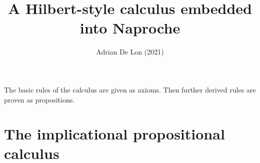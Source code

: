 \documentclass{article}
\title{A Hilbert-style calculus embedded into Naproche}
\author{Adrian De Lon (2021)}
\date{}
\begin{document}

\maketitle

\begin{forthel}
\end{forthel}

The basic rules of the calculus are given as axioms.
Then further derived rules are proven as propositions. 

\section{The implicational propositional calculus}
\end{document}
